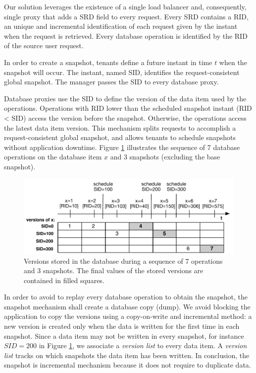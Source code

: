 Our solution leverages the existence of a single load balancer and, consequently, single proxy that adds a \acf{SRD} field to every request. Every \ac{SRD} contains a \ac{RID}, an unique and incremental identification of each request given by the instant when the request is retrieved. Every database operation is identified by the \ac{RID} of the source user request.

In order to create a snapshot, tenants define a future instant in time $t$ when the snapshot will occur. The instant, named \acf{SID}, identifies the request-consistent global snapshot. The manager passes the \ac{SID} to every database proxy.

Database proxies use the \ac{SID} to define the version of the data item used by the operations. Operations with \acf{RID} lower than the scheduled snapshot instant (\ac{RID} < \ac{SID}) access the version before the snapshot. Otherwise, the operations access the latest data item version. This mechanism splits requests to accomplish a request-consistent global snapshot, and allows tenants to schedule snapshots without application downtime. Figure \ref{fig:snapshots} illustrates the sequence of 7 database operations on the database item $x$ and 3 snapshots (excluding the base snapshot).

\begin{figure}
\centering
  \includegraphics[width=130mm]{images/snapshots}
  \caption[Snapshot versions stored in the database]{Versions stored in the database during a sequence of 7 operations and 3 snapshots. The final values of the stored versions are contained in filled squares.}
\label{fig:snapshots}
\end{figure}

In order to avoid to replay every database operation to obtain the snapshot, the snapshot mechanism shall create a database copy (dump). We avoid blocking the application to copy the versions using a copy-on-write and incremental method: a new version is created only when the data is written for the first time in each snapshot. Since a data item may not be written in every snapshot, for instance $SID=200$ in Figure \ref{fig:snapshots}, we associate a \emph{version list} to every data item. A \emph{version list} tracks on which snapshots the data item has been written. In conclusion, the snapshot is incremental mechanism because it does not require to duplicate data.\\



